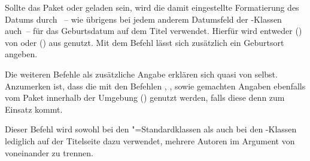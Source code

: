 \begin{DeclareEntity*}{}
\begin{DeclareEntity*}{}
\begin{DeclareEntity*}{}
\begin{Declaration}
\begin{Declaration}
\begin{Declaration}
\begin{Declaration}
\begin{Declaration}
\begin{Declaration}
\begin{Declaration}
\begin{Declaration}
\begin{Declaration}
\begin{Declaration}
Sollte das Paket  oder  geladen sein, wird 
die damit eingestellte Formatierung des Datums durch ~-- wie 
übrigens bei jedem anderem Datumsfeld der \TUDScript-Klassen auch~-- für das 
Geburtsdatum auf dem Titel verwendet. Hierfür wird entweder  
() von  oder 
() aus  genutzt. Mit dem 
Befehl  lässt sich zusätzlich ein Geburtsort angeben.

Die weiteren Befehle als zusätzliche Angabe erklären sich quasi von selbst. 
Anzumerken ist, dass die mit den Befehlen ,  
,  sowie  gemachten 
Angaben ebenfalls vom Paket  innerhalb der 
Umgebung () genutzt werden, falls 
diese denn zum Einsatz kommt.
\end{Declaration}
\end{Declaration}
\end{Declaration}
\end{Declaration}
\end{Declaration}
\end{Declaration}
\end{Declaration}
\end{Declaration}
\end{Declaration}
\end{Declaration}

\begin{Declaration}
  {}

Dieser Befehl wird sowohl bei den "=Standardklassen als auch bei 
den \KOMAScript-Klassen lediglich auf der Titelseite dazu verwendet, mehrere 
Autoren im Argument von  voneinander zu trennen.


\end{Declaration}
\end{DeclareEntity*}
\end{DeclareEntity*}
\end{DeclareEntity*}
